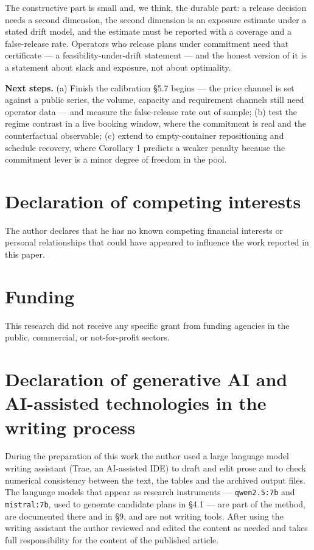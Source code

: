 \documentclass[preprint,12pt,letterpaper]{elsarticle}
\theoremstyle{definition}
\theoremstyle{plain}
\begin{document}
The constructive part is small and, we think, the durable part: a release decision needs a second dimension, the second dimension is an exposure estimate under a stated drift model, and the estimate must be reported with a coverage and a false-release rate. Operators who release plans under commitment need that certificate --- a feasibility-under-drift statement --- and the honest version of it is a statement about slack and exposure, not about optimality.

\textbf{Next steps.} (a) Finish the calibration \S 5.7 begins --- the price channel is set against a public series, the volume, capacity and requirement channels still need operator data --- and measure the false-release rate out of sample; (b) test the regime contrast in a live booking window, where the commitment is real and the counterfactual observable; (c) extend to empty-container repositioning and schedule recovery, where Corollary 1 predicts a weaker penalty because the commitment lever is a minor degree of freedom in the pool.

\section*{Declaration of competing interests}

The author declares that he has no known competing financial interests or personal relationships that could have appeared to influence the work reported in this paper.

\section*{Funding}

This research did not receive any specific grant from funding agencies in the public, commercial, or not-for-profit sectors.

\section*{Declaration of generative AI and AI-assisted technologies in the writing process}

During the preparation of this work the author used a large language model writing assistant (Trae, an AI-assisted IDE) to draft and edit prose and to check numerical consistency between the text, the tables and the archived output files. The language models that appear as research instruments --- \texttt{qwen2.5:7b} and \texttt{mistral:7b}, used to generate candidate plans in \S 4.1 --- are part of the method, are documented there and in \S 9, and are not writing tools. After using the writing assistant the author reviewed and edited the content as needed and takes full responsibility for the content of the published article.
\end{document}
